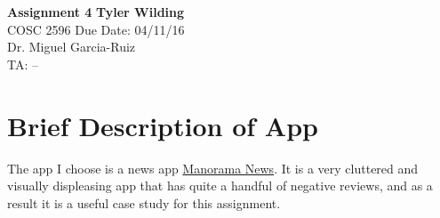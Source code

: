 \documentclass[a4paper, 11pt]{article}
\begin{document}
\noindent
\large\textbf{Assignment 4} \hfill \textbf{Tyler Wilding} \\
\normalsize COSC 2596 \hfill Due Date: 04/11/16 \\
Dr. Miguel Garcia-Ruiz \hfill \\
TA: -- \hfill

\section*{Brief Description of App}
The app I choose is a news app \href{https://play.google.com/store/apps/details?id=com.manoramaonline.mmtv}{Manorama News}.  It is a very cluttered and visually displeasing app that has quite a handful of negative reviews, and as a result it is a useful case study for this assignment.
\end{document}
